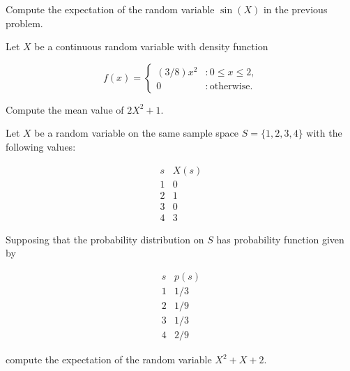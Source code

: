 \documentclass[12pt,reqno]{amsart}
\begin{document}
\newpage
\prob Compute the expectation of the random variable $\sin(X)$ in the previous problem.\vfill













\bigskip
\prob Let $X$ be a continuous random variable with density function
	
	\[
	f(x) = \begin{cases}
	(3/8)x^2 & : 0 \leq x \leq 2, \\
	0 & : \text{otherwise}.
	\end{cases}
	\]

Compute the mean value of $2X^2+1$.\vfill















\bigskip
\prob Let $X$ be a random variable on the same sample space $S = \{1,2,3,4\}$ with the following values:

	\[
	\begin{array}{c|c}
	s & X(s)  \\ \hline
	1 & 0  \\
	2 & 1  \\
	3 & 0 \\
	4 & 3
	\end{array}
	\]

Supposing that the probability distribution on $S$ has probability function given by

	\[
	\begin{array}{c|c}
	s & p(s)  \\ \hline
	1 & 1/3  \\
	2 & 1/9  \\
	3 & 1/3 \\
	4 & 2/9
	\end{array}
	\]

compute the expectation of the random variable $X^2 + X + 2$.\vfill
\end{document}
